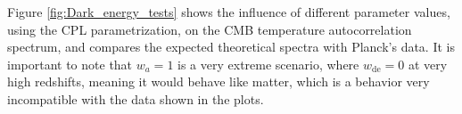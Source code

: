 \documentclass[openany,a4paper,12pt,oneside]{book}
\begin{document}
\begin{spacing}{1.5}
Figure \ref{fig:Dark_energy_tests} shows the influence of different parameter values, using the CPL parametrization, on the CMB temperature autocorrelation spectrum, and compares the expected theoretical spectra with Planck's data. It is important to note that $w_a=1$ is a very extreme scenario, where $w_\text{de}=0$ at very high redshifts, meaning it would behave like matter, which is a behavior very incompatible with the data shown in the plots.


\begin{figure}
	\centering
\end{figure}
\end{spacing}
\end{document}
